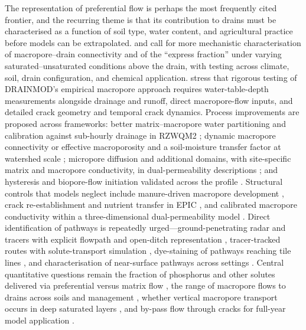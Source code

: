 \documentclass[11pt]{article}
\begin{document}
The representation of preferential flow is perhaps the most frequently cited
frontier, and the recurring theme is that its contribution to drains must be
characterised as a function of soil type, water content, and agricultural
practice before models can be extrapolated. \textcite{Gaillot2023} and
\textcite{Fox2004} call for more mechanistic characterisation of
macropore--drain connectivity and of the ``express fraction'' under varying
saturated--unsaturated conditions above the drain, with testing across climate,
soil, drain configuration, and chemical application. \textcite{Askar2020} stress
that rigorous testing of DRAINMOD's empirical macropore approach requires
water-table-depth measurements alongside drainage and runoff, direct
macropore-flow inputs, and detailed crack geometry and temporal crack dynamics.
Process improvements are proposed across frameworks: better matrix--macropore
water partitioning and calibration against sub-hourly drainage in RZWQM2
\parencite{Li2023d}; dynamic macropore connectivity or effective macroporosity
and a soil-moisture transfer factor at watershed scale \parencite{Poon2021};
micropore diffusion and additional domains, with site-specific matrix and
macropore conductivity, in dual-permeability descriptions
\parencite{Villholth1998,Villholth1998b}; and hysteresis and biopore-flow
initiation validated across the profile \parencite{Holbak2021}. Structural
controls that models neglect include manure-driven macropore development
\parencite{Zhao2001}, crack re-establishment and nutrient transfer in EPIC
\parencite{Wang2022}, and calibrated macropore conductivity within a
three-dimensional dual-permeability model \parencite{Varvaris2018}. Direct
identification of pathways is repeatedly urged---ground-penetrating radar and
tracers with explicit flowpath and open-ditch representation
\parencite{Tähtikarhu2025}, tracer-tracked routes with solute-transport
simulation \parencite{Salo2017}, dye-staining of pathways reaching tile lines
\parencite{Nielsen2015}, and characterisation of near-surface pathways across
settings \parencite{Frey2012,Allaire2011}. Central quantitative questions
remain the fraction of phosphorus and other solutes delivered via preferential
versus matrix flow \parencite{King2015,Williams2016}, the range of macropore
flows to drains across soils and management \parencite{Reid2012}, whether
vertical macropore transport occurs in deep saturated layers
\parencite{Villholth1998}, and by-pass flow through cracks for full-year model
application \parencite{LESAFFRE1988,BACKLUND1995,Ruark2009}.
\end{document}
